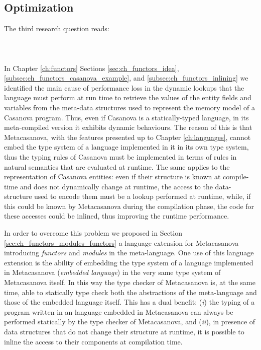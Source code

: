 \subsection{Optimization}
\label{subsec:ch_conclusion_rq3}
The third research question reads:\\\\
\researchQuestion{\rqContentThree}\\\\

In Chapter \ref{ch:functors} Sections \ref{sec:ch_functors_idea}, \ref{subsec:ch_functors_casanova_example}, and \ref{subsec:ch_functors_inlining} we identified the main cause of performance loss in the dynamic lookups that the language must perform at run time to retrieve the values of the entity fields and variables from the meta-data structures used to represent the memory model of a Casanova program. Thus, even if Casanova is a statically-typed language, in its meta-compiled version it exhibits dynamic behaviours. The reason of this is that Metacasanova, with the features presented up to Chapter \ref{ch:languages}, cannot embed the type system of a language implemented in it in its own type system, thus the typing rules of Casanova must be implemented in terms of rules in natural semantics that are evaluated at runtime. The same applies to the representation of Casanova entities: even if their structure is known at compile-time and does not dynamically change at runtime, the access to the data-structure used to encode them must be a lookup performed at runtime, while, if this could be known by Metacasanova during the compilation phase, the code for these accesses could be inlined, thus improving the runtime performance.

In order to overcome this problem we proposed in Section \ref{sec:ch_functors_modules_functors} a language extension for Metacasanova introducing \textit{functors} and \textit{modules} in the meta-language. One use of this language extension is the ability of embedding the type system of a language implemented in Metacasanova (\textit{embedded language}) in the very same type system of Metacasanova itself. In this way the type checker of Metacasanova is, at the same time, able to statically type check both the abstractions of the meta-language and those of the embedded language itself. This has a dual benefit: (\textit{i}) the typing of a program written in an language embedded in Metacasanova can always be performed statically by the type checker of Metacasanova, and (\textit{ii}), in presence of data structures that do not change their structure at runtime, it is possible to inline the access to their components at compilation time.

